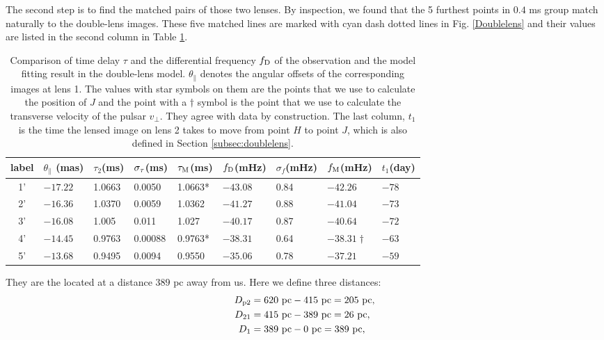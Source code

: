 \documentclass[useAMS,usenatbib]{mn2e}
\begin{document}
The second step is to find the matched pairs of those two lenses.  
By inspection, we found that the 5 furthest points in $0.4$ ms group match naturally to the double-lens images. These five matched lines are marked with cyan dash dotted lines in Fig. \ref{Doublelens} and their values are listed in the second column in Table \ref{table:double_lens_compare}. 
\begin{table}
\centering
\begin{tabular}{c|llllllll}
\hline
label&$\theta_{\parallel}$ (mas)  & $\tau_2$(ms) & $\sigma_{\rm \tau}$(ms)  & $\tau_{\rm M}$(ms) & $f_{\rm D}$(mHz)  &$\sigma_{f}$(mHz)      &  $f_{\rm M}$(mHz)& $t_1$(day) \\ \hline
1'& $-17.22$  &  1.0663     &0.0050    & 1.0663*        & $-43.08$    &0.84   & $-42.26$           & $-78$\\
 2'& $-16.36$  &    1.0370     &0.0059    & 1.0362       & $-41.27$    & 0.88   & $-41.04$          & $-73$\\ 
3'& $-16.08$  &   1.005    &0.011   & 1.027          & $-40.17$    &   0.87     & $-40.64$          & $-72$\\ 
 4'& $-14.45$  &   0.9763    &0.00088   & 0.9763*       & $-38.31$     &0.64    & $-38.31\dagger$  & $-63$\\ 
5'& $-13.68$  &    0.9495     &0.0094    & 0.9550       & $-35.06$     &0.78    & $-37.21$          &$-59$\\ 
 \hline
\end{tabular}
\caption{Comparison of time delay $\tau$ and the differential
  frequency $f_{\rm D}$ of the observation and the model fitting result in the
  double-lens model. $\theta_{\parallel}$ denotes the angular offsets
  of the corresponding images at lens 1. 
The values with star symbols on them are the points that we use to
calculate the position of $J$ and the point with a $\dagger$ symbol is
the point that we use to calculate the transverse velocity of the
pulsar $v_{\bot}$.  They agree with data by construction. The last
column, $t_1$ is the time the lensed image on lens 2 takes to move
from point $H$ to point $J$, which is also defined in Section
\ref{subsec:doublelens}.} 
\label{table:double_lens_compare}
\end{table}
They are the located at a distance $389$ pc away from us. Here we define three distances:
\begin{equation}
\begin{aligned}
D_{\rm p2}&=620~{\rm pc}-415~{\rm pc} =205~{\rm pc},\\
D_{21}&=415~{\rm pc}-389~{\rm pc} =26~{\rm pc},\\
D_{1}&=389~{\rm pc}- 0~{\rm pc} = 389~{\rm pc}, 
\end{aligned} 
\end{equation}
\end{document}
